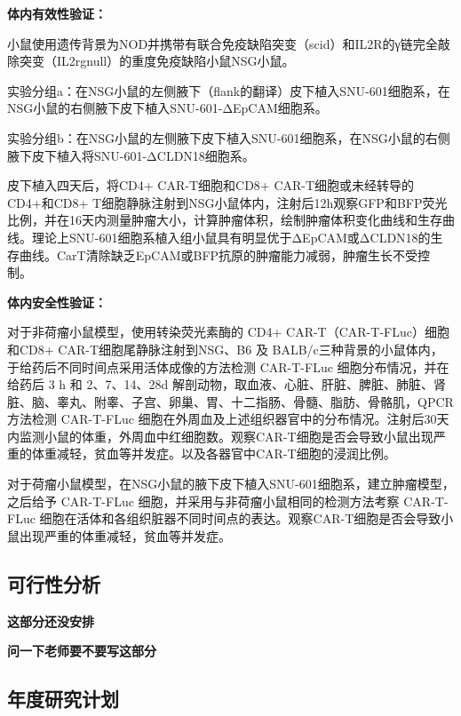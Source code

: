 \documentclass[12pt]{article}
\begin{document}
\textbf{体内有效性验证：}

小鼠使用遗传背景为NOD并携带有联合免疫缺陷突变（scid）和IL2R的γ链完全敲除突变（IL2rgnull）的重度免疫缺陷小鼠NSG小鼠。

实验分组a：在NSG小鼠的左侧腋下（flank的翻译）皮下植入SNU-601细胞系，在NSG小鼠的右侧腋下皮下植入SNU-601-ΔEpCAM细胞系。

实验分组b：在NSG小鼠的左侧腋下皮下植入SNU-601细胞系，在NSG小鼠的右侧腋下皮下植入将SNU-601-ΔCLDN18细胞系。

皮下植入四天后，将CD4+ CAR-T细胞和CD8+ CAR-T细胞或未经转导的CD4+和CD8+ T细胞静脉注射到NSG小鼠体内，注射后12h观察GFP和BFP荧光比例，并在16天内测量肿瘤大小，计算肿瘤体积，绘制肿瘤体积变化曲线和生存曲线。理论上SNU-601细胞系植入组小鼠具有明显优于ΔEpCAM或ΔCLDN18的生存曲线。CarT清除缺乏EpCAM或BFP抗原的肿瘤能力减弱，肿瘤生长不受控制。


\textbf{体内安全性验证：}

对于非荷瘤小鼠模型，使用转染荧光素酶的 CD4+ CAR-T（CAR-T-FLuc）细胞和CD8+ CAR-T细胞尾静脉注射到NSG、B6 及 BALB/c三种背景的小鼠体内，于给药后不同时间点采用活体成像的方法检测 CAR-T-FLuc 细胞分布情况，并在给药后 3 h 和 2、7、14、28d 解剖动物，取血液、心脏、肝脏、脾脏、肺脏、肾脏、脑、睾丸、附睾、子宫、卵巢、胃、十二指肠、骨髓、脂肪、骨骼肌，QPCR 方法检测 CAR-T-FLuc 细胞在外周血及上述组织器官中的分布情况。注射后30天内监测小鼠的体重，外周血中红细胞数。观察CAR-T细胞是否会导致小鼠出现严重的体重减轻，贫血等并发症。以及各器官中CAR-T细胞的浸润比例。


对于荷瘤小鼠模型，在NSG小鼠的腋下皮下植入SNU-601细胞系，建立肿瘤模型，之后给予 CAR-T-FLuc 细胞，并采用与非荷瘤小鼠相同的检测方法考察 CAR-T-FLuc 细胞在活体和各组织脏器不同时间点的表达。观察CAR-T细胞是否会导致小鼠出现严重的体重减轻，贫血等并发症。


\subsection{可行性分析}



\textbf{这部分还没安排}


\textbf{问一下老师要不要写这部分}

\subsection{年度研究计划}
\end{document}
